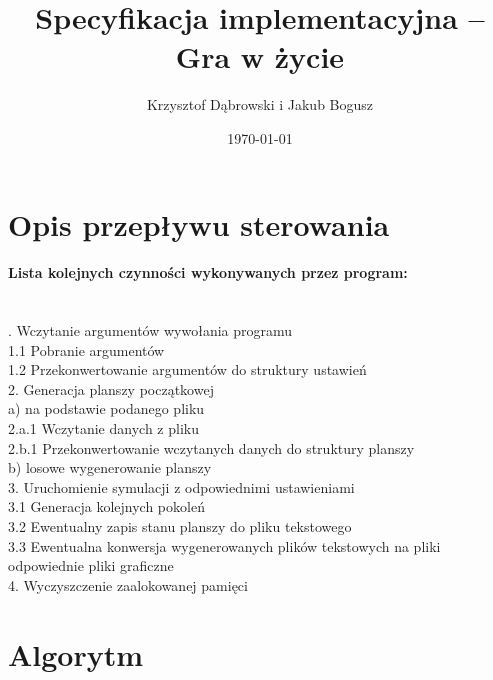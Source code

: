\documentclass{article}
\title{Specyfikacja implementacyjna -- Gra w życie}
\author{Krzysztof Dąbrowski i Jakub Bogusz}
\date{\today}
\begin{document}
\maketitle{}

\tableofcontents{}

\section{Opis przepływu sterowania}

\paragraph{Lista kolejnych czynności wykonywanych przez program:}\mbox{}\\

. Wczytanie argumentów wywołania programu\\
	\hspace*{10mm}1.1 Pobranie argumentów\\
	\hspace*{10mm}1.2 Przekonwertowanie argumentów do struktury ustawień\\
2. Generacja planszy początkowej\\
		\hspace*{10mm}a) na podstawie podanego pliku\\
			\hspace*{20mm}2.a.1 Wczytanie danych z pliku\\
			\hspace*{20mm}2.b.1 Przekonwertowanie wczytanych danych do struktury planszy\\
		\hspace*{10mm}b) losowe wygenerowanie planszy\\
3. Uruchomienie symulacji z odpowiednimi ustawieniami\\
		\hspace*{10mm}3.1 Generacja kolejnych pokoleń\\
		\hspace*{10mm}3.2 Ewentualny zapis stanu planszy do pliku tekstowego\\
		\hspace*{10mm}3.3 Ewentualna konwersja wygenerowanych plików tekstowych na pliki \hspace*{15mm} odpowiednie pliki graficzne\\
4. Wyczyszczenie zaalokowanej pamięci\\

\section{Algorytm}
\end{document}

